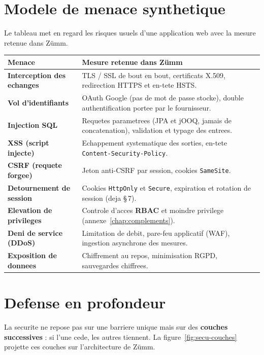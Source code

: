 \section{Modele de menace synthetique}
Le tableau met en regard les risques usuels d'une application web avec la mesure
retenue dans Z\"umm.
\begin{xltabular}{\textwidth}{>{\bfseries}p{4cm} X}
\toprule
\textbf{Menace} & \textbf{Mesure retenue dans Z\"umm} \\
\midrule
\endhead
Interception des echanges & TLS / SSL de bout en bout, certificats X.509, redirection HTTPS et en-tete HSTS. \\
Vol d'identifiants & OAuth Google (pas de mot de passe stocke), double authentification portee par le fournisseur. \\
Injection SQL & Requetes parametrees (JPA et jOOQ, jamais de concatenation), validation et typage des entrees. \\
XSS (script injecte) & Echappement systematique des sorties, en-tete \texttt{Content-Security-Policy}. \\
CSRF (requete forgee) & Jeton anti-CSRF par session, cookies \texttt{SameSite}. \\
Detournement de session & Cookies \texttt{HttpOnly} et \texttt{Secure}, expiration et rotation de session (deja §\,7). \\
Elevation de privileges & Controle d'acces \textbf{RBAC} et moindre privilege (annexe~\ref{chap:complements}). \\
Deni de service (DDoS) & Limitation de debit, pare-feu applicatif (WAF), ingestion asynchrone des mesures. \\
Exposition de donnees & Chiffrement au repos, minimisation RGPD, sauvegardes chiffrees. \\
\bottomrule
\end{xltabular}

\section{Defense en profondeur}
La securite ne repose pas sur une barriere unique mais sur des \textbf{couches
successives} : si l'une cede, les autres tiennent. La figure~\ref{fig:secu-couches}
projette ces couches sur l'architecture de Z\"umm.

